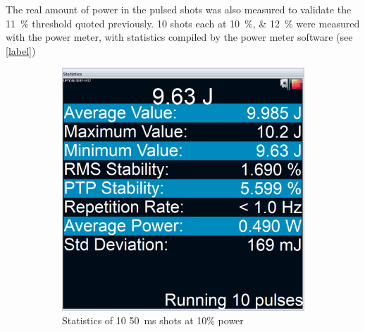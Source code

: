             The real amount of power in the pulsed shots was also measured to validate the \qty{11}{\%} threshold quoted previously. 10 shots each at \qtylist{10; 12}{\%} were measured with the power meter, with statistics compiled by the power meter software (see \autoref{label})

            \begin{figure}[h]
                \centering
                \begin{subfigure}[t]{0.45\textwidth}
                    \centering
                    \includegraphics[width=\textwidth]{assets/5 results/10p 50ms Statistics.png}
                    \caption{Statistics of 10 \qty{50}{ms} shots at 10\% power}
                \end{subfigure}
                \hfill
                \begin{subfigure}[t]{0.45\textwidth}
                    \centering

\end{subfigure}
\end{figure}
